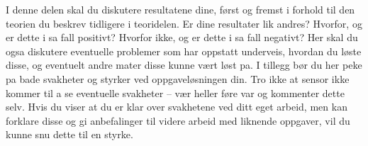 I denne delen skal du diskutere resultatene dine, først og fremst i forhold til den teorien du beskrev tidligere i teoridelen. Er dine resultater lik andres? Hvorfor, og er dette i sa fall positivt? Hvorfor ikke, og er dette i sa fall negativt? Her skal du ogsa diskutere eventuelle problemer som har oppstatt underveis, hvordan du løste disse, og eventuelt andre mater disse kunne vært løst pa.
I tillegg bør du her peke pa bade svakheter og styrker ved oppgaveløsningen din. Tro ikke at sensor ikke kommer til a se eventuelle svakheter – vær heller føre var og kommenter dette selv. Hvis du viser at du er klar over svakhetene ved ditt eget arbeid, men kan forklare disse og gi anbefalinger til videre arbeid med liknende oppgaver, vil du kunne snu dette til en styrke.
